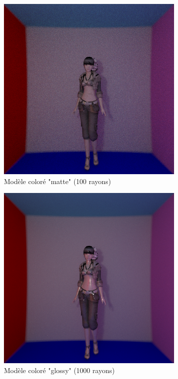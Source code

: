 \documentclass[12pt,a4paper,twoside]{report}
\begin{document}
\begin{figure}[H]
	\centering
	\begin{subfigure}{.45\textwidth}
		\centering
		\includegraphics[width=1.\textwidth]{be7_01_100R_5O}
		\caption{Modèle coloré "matte" (100 rayons)}
		\label{fig:be7_01_100R_5O}
		\end{subfigure}
	\begin{subfigure}{.45\textwidth}
		\centering
		\includegraphics[width=1.\textwidth]{be7_03_1000R_5O_10000n}
		\caption{Modèle coloré "glossy" (1000 rayons)}
		\label{fig:be7_03_1000R_5O_10000n}
	\end{subfigure}
	\caption{}
\end{figure}
\end{document}

